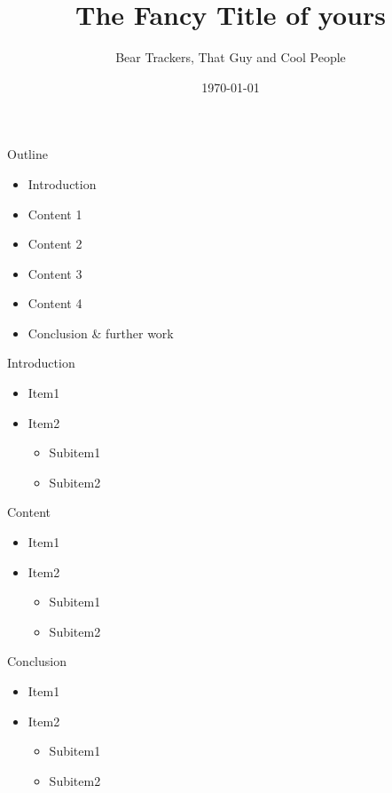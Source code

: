 \documentclass[a4paper]{beamer}
\title{The Fancy Title of yours}
\author{Bear Trackers, That Guy and Cool People}
\date{\today}
\begin{document}
%
\begin{frame}
	\maketitle
\end{frame}

\begin{frame}{Outline}
	\begin{itemize}
		\item Introduction
		\vfill
		\item Content 1
		\vfill
		\item Content 2 
		\vfill
		\item Content 3
		\vfill
		\item Content 4
		\vfill
		\item Conclusion \& further work
		\vfill
	\end{itemize}
\end{frame}

\begin{frame}{Introduction}
	\begin{itemize}
		\item Item1
		\item Item2
			\begin{itemize}
				\item Subitem1
				\item Subitem2
			\end{itemize}
	\end{itemize}
\end{frame}

\begin{frame}{Content}
	\begin{itemize}
		\item Item1
		\item Item2
			\begin{itemize}
				\item Subitem1
				\item Subitem2
			\end{itemize}
	\end{itemize}
\end{frame}

\begin{frame}{Conclusion}
	\begin{itemize}
		\item Item1
		\item Item2
			\begin{itemize}
				\item Subitem1
				\item Subitem2
			\end{itemize}
	\end{itemize}
\end{frame}

\begin{frame}
	\maketitle
\end{frame}
\end{document}
